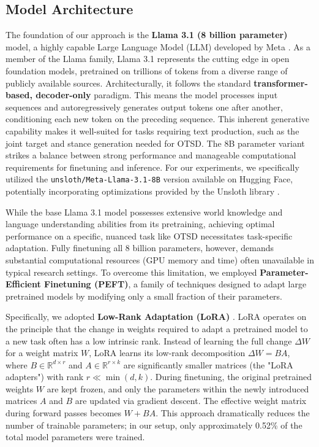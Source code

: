\documentclass[twocolumn, 11pt,letterpaper]{article}
\begin{document}
\subsection{Model Architecture}
\label{sec:model_arch}

The foundation of our approach is the \textbf{Llama 3.1 (8 billion parameter)} model, a highly capable Large Language Model (LLM) developed by Meta \cite{llama3.1}. As a member of the Llama family, Llama 3.1 represents the cutting edge in open foundation models, pretrained on trillions of tokens from a diverse range of publicly available sources. Architecturally, it follows the standard \textbf{transformer-based, decoder-only} paradigm. This means the model processes input sequences and autoregressively generates output tokens one after another, conditioning each new token on the preceding sequence. This inherent generative capability makes it well-suited for tasks requiring text production, such as the joint target and stance generation needed for OTSD. The 8B parameter variant strikes a balance between strong performance and manageable computational requirements for finetuning and inference. For our experiments, we specifically utilized the \texttt{unsloth/Meta-Llama-3.1-8B} version available on Hugging Face, potentially incorporating optimizations provided by the Unsloth library \cite{unsloth}.

While the base Llama 3.1 model possesses extensive world knowledge and language understanding abilities from its pretraining, achieving optimal performance on a specific, nuanced task like OTSD necessitates task-specific adaptation. Fully finetuning all 8 billion parameters, however, demands substantial computational resources (GPU memory and time) often unavailable in typical research settings. To overcome this limitation, we employed \textbf{Parameter-Efficient Finetuning (PEFT)}, a family of techniques designed to adapt large pretrained models by modifying only a small fraction of their parameters.

Specifically, we adopted \textbf{Low-Rank Adaptation (LoRA)} \cite{lora}. LoRA operates on the principle that the change in weights required to adapt a pretrained model to a new task often has a low intrinsic rank. Instead of learning the full change $\Delta W$ for a weight matrix $W$, LoRA learns its low-rank decomposition $\Delta W = BA$, where $B \in \mathbb{R}^{d \times r}$ and $A \in \mathbb{R}^{r \times k}$ are significantly smaller matrices (the "LoRA adapters") with rank $r \ll \min(d, k)$. During finetuning, the original pretrained weights $W$ are kept frozen, and only the parameters within the newly introduced matrices $A$ and $B$ are updated via gradient descent. The effective weight matrix during forward passes becomes $W + BA$. This approach dramatically reduces the number of trainable parameters; in our setup, only approximately 0.52\% of the total model parameters were trained.
\end{document}
